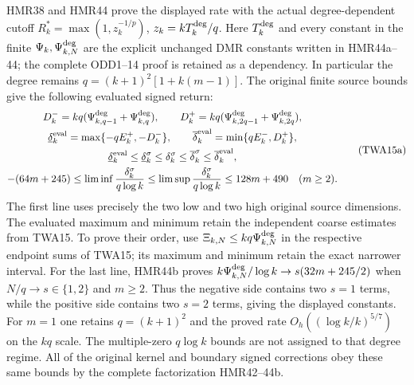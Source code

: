 HMR38 and HMR44 prove the displayed rate with the actual
degree-dependent cutoff $R_k^*=\max(1,z_k^{-1/p})$,
$z_k=kT_k^{\rm deg}/q$. Here $T_k^{\rm deg}$ and every constant
in the finite $\Psi_k,\Psi_{k,N}^{\rm deg}$ are the explicit
unchanged DMR constants written in HMR44a--44; the complete
ODD1--14 proof is retained as a dependency. In particular the
degree remains $q=(k+1)^2[1+k(m-1)]$. The original finite
source bounds give the following evaluated signed return:
\[
\begin{gathered}
 D_k^-=kq(\Psi_{k,q-1}^{\rm deg}+\Psi_{k,q}^{\rm deg}),\qquad
 D_k^+=kq(\Psi_{k,2q-1}^{\rm deg}+\Psi_{k,2q}^{\rm deg}),\\
 \underline\delta_k^{\rm eval}=\max\{-qE_k^+,-D_k^-\},\qquad
 \overline\delta_k^{\rm eval}=\min\{qE_k^-,D_k^+\},\\
 \underline\delta_k^{\rm eval}\leq\underline\delta_k^\sigma
 \leq\delta_k^\sigma\leq\overline\delta_k^\sigma
                    \leq\overline\delta_k^{\rm eval},\\
 -(64m+245)\leq\liminf\frac{\delta_k^\sigma}{q\log k}
 \leq\limsup\frac{\delta_k^\sigma}{q\log k}
 \leq128m+490\quad(m\geq2).
\end{gathered}\tag{TWA15a}
\]
The first line uses precisely the two low and two high original
source dimensions. The evaluated maximum and minimum retain the
independent coarse estimates from TWA15. To prove their order, use
$\Xi_{k,N}\leq kq\Psi_{k,N}^{\rm deg}$ in the respective
endpoint sums of TWA15; its maximum and minimum retain the
exact narrower interval. For the last line, HMR44b proves
$k\Psi_{k,N}^{\rm deg}/\log k\to s(32m+245/2)$ when
$N/q\to s\in\{1,2\}$ and $m\geq2$. Thus the negative
side contains two $s=1$ terms, while the positive side
contains two $s=2$ terms, giving the displayed constants.
For $m=1$ one retains $q=(k+1)^2$ and the proved rate
$O_h((\log k/k)^{5/7})$ on the $kq$ scale. The multiple-zero
$q\log k$ bounds are not assigned to that degree regime.
All of the original kernel and boundary signed corrections
obey these same bounds by the complete factorization HMR42--44b.